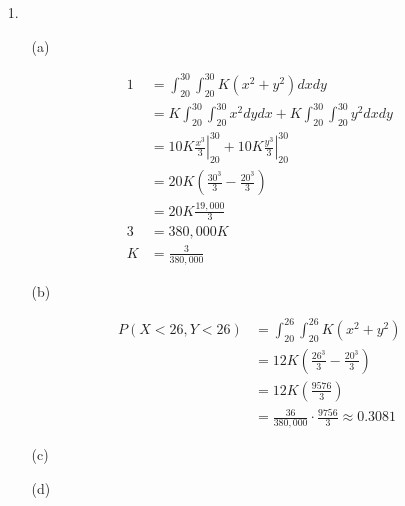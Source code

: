     \begin{itemize}
        \item [1.]
        
            \begin{itemize}
                \item [(a)]
                
                    \begin{align*}
                        1   & = \int_{20}^{30}\int_{20}^{30}K(x^{2}+y^{2})dxdy      \\
                            & = K\int_{20}^{30}\int_{20}^{30}x^{2}dydx 
                              + K\int_{20}^{30}\int_{20}^{30}y^{2}dxdy              \\
                            & = 10K\left.\frac{x^{3}}{3}\right|_{20}^{30} 
                              + 10K\left.\frac{y^{3}}{3}\right|_{20}^{30}           \\
                            & = 20K\left(\frac{30^{3}}{3}-\frac{20^{3}}{3}\right)   \\
                            & = 20K\frac{19,000}{3}                                 \\
                        3   & = 380,000K                                            \\
                        K   & = \boxed{\frac{3}{380,000}}
                    \end{align*}
                
                \item [(b)]
                
                    \begin{align*}
                        P(X < 26, Y < 26)   & = \int_{20}^{26}\int_{20}^{26}K(x^{2}+y^{2})  \\
                                            & = 12K\left(\frac{26^{3}}{3}-\frac{20^{3}}{3}\right)\\
                                            & = 12K\left(\frac{9576}{3}\right)              \\
                                            & = \frac{36}{380,000}\cdot\frac{9756}{3} \approx \boxed{0.3081}
                    \end{align*}
                
                \item [(c)]
                
                    
                
                \item [(d)]
                

\end{itemize}
\end{itemize}
